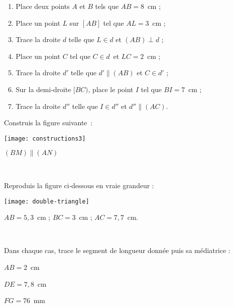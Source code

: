 \begin{exercice}
\begin{enumerate}
 \item Place deux points $A$ et $B$ tels que $AB = 8$ cm ;
 \item Place un point $L$ sur $[AB]$ tel que $AL = 3$ cm ;
 \item Trace la droite $d$ telle que $L \in d$ et $(AB) \perp d$ ;
 \item Place un point $C$ tel que $C \in d$ et $LC = 2$ cm ;
 \item Trace la droite $d'$ telle que $d' \parallel (AB)$ et $C \in d'$ ;
 \item Sur la demi‑droite $[BC)$, place le point $I$ tel que $BI = 7$ cm ;
 \item Trace la droite $d''$ telle que $I \in d''$ et $d'' \parallel (AC)$.
 \end{enumerate}
\end{exercice}


\begin{exercice}
Construis la figure suivante : \\[0.75em]
\begin{minipage}[c]{0.2\textwidth}
\texttt{[image: constructions3]}
 \end{minipage} \hfill%
 \begin{minipage}[c]{0.2\textwidth}
 $(BM) \parallel (AN)$
  \end{minipage} \\
\end{exercice}


\begin{exercice}
Reproduis la figure ci‑dessous en vraie grandeur : \\[0.75em]
\begin{minipage}[c]{0.2\textwidth}
\texttt{[image: double-triangle]}
 \end{minipage} \hfill%
 \begin{minipage}[c]{0.2\textwidth}
$AB = 5,3$ cm ;
$BC = 3$ cm ;
$AC = 7,7$ cm.
 \end{minipage} \\
\end{exercice}



\begin{exercice}[Médiatrices]
Dans chaque cas, trace le segment de longueur donnée puis sa médiatrice :
 \begin{colenumerate}{3}
  \item $AB = 2$ cm 
  \item $DE = 7,8$ cm
  \item $FG = 76$ mm
  \end{colenumerate}
\end{exercice}


